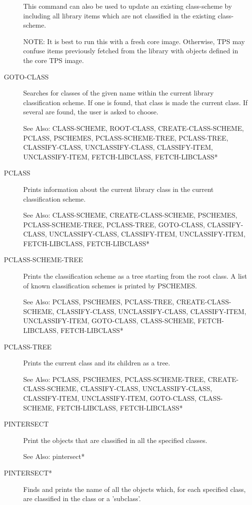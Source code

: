 \begin{description}
This command can also be used to update an existing class-scheme
by including all library items which are not classified in
the existing class-scheme.

NOTE:  It is best to run this with a fresh core image.  Otherwise,
TPS may confuse items previously fetched from the library with
objects defined in the core TPS image.

\item[GOTO-CLASS]  
Searches for classes of the given name within the
current library classification scheme.  If one
is found, that class is made the current class.
If several are found, the user is asked to choose.

See Also: CLASS-SCHEME, ROOT-CLASS, CREATE-CLASS-SCHEME, PCLASS, PSCHEMES,
PCLASS-SCHEME-TREE, PCLASS-TREE, CLASSIFY-CLASS, UNCLASSIFY-CLASS, 
CLASSIFY-ITEM, UNCLASSIFY-ITEM, FETCH-LIBCLASS, FETCH-LIBCLASS*

\item[PCLASS]  
Prints information about the current library class in the current
classification scheme.

See Also: CLASS-SCHEME, CREATE-CLASS-SCHEME, PSCHEMES, 
PCLASS-SCHEME-TREE, PCLASS-TREE, GOTO-CLASS, CLASSIFY-CLASS, 
UNCLASSIFY-CLASS, CLASSIFY-ITEM, UNCLASSIFY-ITEM,
FETCH-LIBCLASS, FETCH-LIBCLASS*

\item[PCLASS-SCHEME-TREE]  
Prints the classification scheme as a tree starting from the root class.
A list of known classification schemes is printed by PSCHEMES.

See Also: PCLASS, PSCHEMES, PCLASS-TREE, CREATE-CLASS-SCHEME, 
CLASSIFY-CLASS, UNCLASSIFY-CLASS, CLASSIFY-ITEM, UNCLASSIFY-ITEM, 
GOTO-CLASS, CLASS-SCHEME, FETCH-LIBCLASS, FETCH-LIBCLASS*

\item[PCLASS-TREE]  
Prints the current class and its children as a tree.

See Also: PCLASS, PSCHEMES, PCLASS-SCHEME-TREE, CREATE-CLASS-SCHEME, 
CLASSIFY-CLASS, UNCLASSIFY-CLASS, CLASSIFY-ITEM, UNCLASSIFY-ITEM, 
GOTO-CLASS, CLASS-SCHEME, FETCH-LIBCLASS, FETCH-LIBCLASS*

\item[PINTERSECT]  
Print the objects that are classified in all the specified classes.

See Also: pintersect*

\item[PINTERSECT*]  
Finds and prints the name of all the objects which, for each
specified class, are classified in the class or a 'subclass'.


\end{description}
